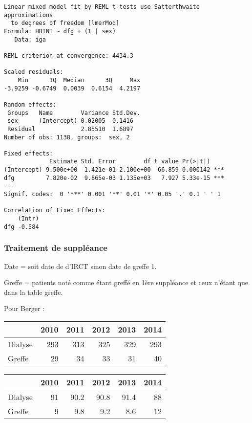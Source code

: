 \documentclass[11pt,a4paper]{article}\usepackage[]{graphicx}\usepackage[]{color}
\makeatletter
\newenvironment{kframe}{%
 \def\at@end@of@kframe{}%
 \ifinner\ifhmode%
  \def\at@end@of@kframe{\end{minipage}}%
  \begin{minipage}{\columnwidth}%
 \fi\fi%
 \def\FrameCommand##1{\hskip\@totalleftmargin \hskip-\fboxsep
 \colorbox{shadecolor}{##1}\hskip-\fboxsep
     \hskip-\linewidth \hskip-\@totalleftmargin \hskip\columnwidth}%
 \MakeFramed {\advance\hsize-\width
   \@totalleftmargin\z@ \linewidth\hsize
   \@setminipage}}%
 {\par\unskip\endMakeFramed%
 \at@end@of@kframe}
\newenvironment{knitrout}{}{} %
\makeatother
\begin{document}
\begin{knitrout}
\color{fgcolor}\begin{kframe}
\begin{verbatim}
Linear mixed model fit by REML t-tests use Satterthwaite approximations
  to degrees of freedom [lmerMod]
Formula: HBINI ~ dfg + (1 | sex)
   Data: iga

REML criterion at convergence: 4434.3

Scaled residuals: 
    Min      1Q  Median      3Q     Max 
-3.9259 -0.6749  0.0039  0.6154  4.2197 

Random effects:
 Groups   Name        Variance Std.Dev.
 sex      (Intercept) 0.02005  0.1416  
 Residual             2.85510  1.6897  
Number of obs: 1138, groups:  sex, 2

Fixed effects:
             Estimate Std. Error        df t value Pr(>|t|)    
(Intercept) 9.500e+00  1.421e-01 2.100e+00  66.859 0.000142 ***
dfg         7.820e-02  9.865e-03 1.135e+03   7.927 5.33e-15 ***
---
Signif. codes:  0 '***' 0.001 '**' 0.01 '*' 0.05 '.' 0.1 ' ' 1

Correlation of Fixed Effects:
    (Intr)
dfg -0.584
\end{verbatim}
\end{kframe}
\end{knitrout}


    \subsubsection{Traitement de suppléance}

Date = soit date de d'IRCT sinon date de greffe 1. 

Greffe = patients noté comme étant greffé en 1ère suppléance et ceux n'étant que dans la table greffe.

Pour Berger :

\begin{table}[H]
\centering
\begin{tabular}{lrrrrr}
  \hline
 & 2010 & 2011 & 2012 & 2013 & 2014 \\ 
  \hline
Dialyse & 293 & 313 & 325 & 329 & 293 \\ 
  Greffe & 29 & 34 & 33 & 31 & 40 \\ 
   \hline
\end{tabular}
\end{table}
\begin{table}[H]
\centering
\begin{tabular}{lrrrrr}
  \hline
 & 2010 & 2011 & 2012 & 2013 & 2014 \\ 
  \hline
Dialyse & 91 & 90.2 & 90.8 & 91.4 & 88 \\ 
  Greffe & 9 & 9.8 & 9.2 & 8.6 & 12 \\ 
   \hline
\end{tabular}
\end{table}
\end{document}
